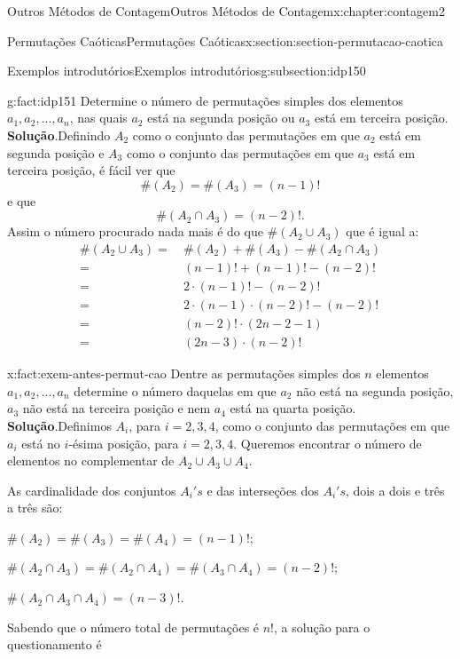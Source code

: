 \documentclass[oneside,10pt,]{book}
\newcommand{\blocktitlefont}{\relax}
\numberwithin{equation}{section}
\newcommand{\amp}{&}
\begin{document}
\begin{chapterptx}{Outros Métodos de Contagem}{}{Outros Métodos de Contagem}{}{}{x:chapter:contagem2}
\begin{sectionptx}{Permutações Caóticas}{}{Permutações Caóticas}{}{}{x:section:section-permutacao-caotica}
\begin{subsectionptx}{Exemplos introdutórios}{}{Exemplos introdutórios}{}{}{g:subsection:idp150}
\begin{fact}{}{}{g:fact:idp151}%
Determine o número de permutações simples dos elementos \(a_1, a_2, . . . , a_n\), nas quais \(a_2\) está na segunda posição ou \(a_3\) está em terceira posição.%
\textbf{\blocktitlefont Solução}.\quad{}Definindo \(A_2\) como o conjunto das permutações em que \(a_2\) está em segunda posição e \(A_3\) como o conjunto das permutações em que \(a_3\) está em terceira posição, é fácil ver que%
\begin{equation*}
\#(A_{2})=\#(A_{3})=(n-1)!
\end{equation*}
e que%
\begin{equation*}
\#(A_{2}\cap A_{3})=(n-2)!.
\end{equation*}
Assim o número procurado nada mais é do que \(\#(A_{2} \cup A_{3})\) que é igual a:%
\begin{align*}
\#(A_2\cup A_3) = \amp ~ \#(A_2) + \#(A_3) - \#(A_2\cap A_3) \\
= \amp ~ (n-1)! + (n-1)!-(n-2)! \\
= \amp ~ 2\cdot(n-1)! - (n-2)! \\
= \amp ~ 2\cdot(n - 1)\cdot(n - 2)! - (n - 2)! \\
= \amp ~ (n-2)!\cdot(2n-2-1) \\
= \amp ~ (2n-3)\cdot(n-2)! 
\end{align*}
%
\end{fact}
\begin{fact}{}{}{x:fact:exem-antes-permut-cao}%
Dentre as permutações simples dos \(n\) elementos \(a_1, a_2, . . . , a_n\) determine o número daquelas em que \(a_2\) não está na segunda posição, \(a_3\) não está na terceira posição e nem \(a_4\) está na quarta posição.%
\textbf{\blocktitlefont Solução}.\quad{}Definimos \(A_i\), para \(i = 2, 3, 4\), como o conjunto das permutações em que \(a_i\) está no \(i\)-ésima posição, para \(i = 2, 3, 4\). Queremos encontrar o número de elementos no complementar de \(A_2\cup A_3\cup A_4\).%
\par
As cardinalidade dos conjuntos \(A_i's\) e das interseções dos \(A_i's\), dois a dois e três a três são:%
\par
\(\#(A_2) = \#(A_3) = \#(A_4) = (n-1)!;\)%
\par
\(\#(A_2\cap A_3) = \#(A_2\cap A_4) = \#(A_3\cap A_4) = (n-2)!;\)%
\par
\(\#(A_2\cap A_3\cap A_4) = (n-3)!.\)%
\par
Sabendo que o número total de permutações é \(n!\), a solução para o questionamento é%
\begin{gather*}

\end{gather*}
\end{fact}
\end{subsectionptx}
\end{sectionptx}
\end{chapterptx}
\end{document}
